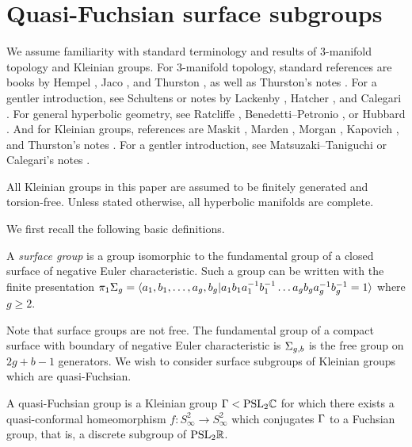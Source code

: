 \section{Quasi-Fuchsian surface subgroups}

We assume familiarity with standard terminology and results of $3$-manifold
topology and Kleinian groups.  For $3$-manifold topology, standard references
are books by Hempel \cite{He}, Jaco \cite{Ja}, and Thurston
\cite{Thurstonbook}, as well as Thurston's notes \cite{Thurstonnotes}.  For
a gentler introduction, see Schultens \cite{Sch} or notes by Lackenby
\cite{Lackenbynotes}, Hatcher \cite{Hatchernotes}, and Calegari
\cite{Calegarinotes2}. For general hyperbolic geometry, see Ratcliffe
\cite{Ratcliffe}, Benedetti--Petronio \cite{BenedettiPetronio}, or Hubbard
\cite{Hubbard}.  And for Kleinian groups, references are Maskit \cite{Maskit},
Marden \cite{Marden}, Morgan \cite{Mo}, Kapovich \cite{Kapovich}, and
Thurston's notes \cite{Thurstonnotes}.  For a gentler introduction, see
Matsuzaki--Taniguchi \cite{MatsuzakiTaniguchi} or Calegari's notes
\cite{Calegarinotes}.

All Kleinian groups in this paper are assumed to be finitely generated and
torsion-free. Unless stated otherwise, all hyperbolic manifolds are complete.

We first recall the following basic definitions.

\begin{defn}

A \emph{surface group} is a group isomorphic to the fundamental group of
a closed surface of negative Euler characteristic. Such a group can be written
with the finite presentation
%
$\pi_1 \Sigma_g = \langle a_1,b_1,\dots,a_g,b_g | a_1b_1a_1^{-1}b_1^{-1} \dots
a_gb_ga_g^{-1}b_g^{-1} = 1\rangle$
%
where $g \geq 2$.

\end{defn}

Note that surface groups are not free. The fundamental group of a compact
surface with boundary of negative Euler characteristic is $\Sigma_{g,b}$ is the
free group on $2g + b - 1$ generators. We wish to consider surface subgroups of
Kleinian groups which are quasi-Fuchsian.

\begin{defn}

A {quasi-Fuchsian group} is a Kleinian group $\Gamma < \mathrm{PSL}_2\mathbb{C}$ for which there
exists a quasi-conformal homeomorphism $f \colon S^2_\infty \to S^2_\infty$
which conjugates $\Gamma$ to a Fuchsian group, that is, a discrete subgroup of
$\mathrm{PSL}_2\mathbb{R}$.

\end{defn}

